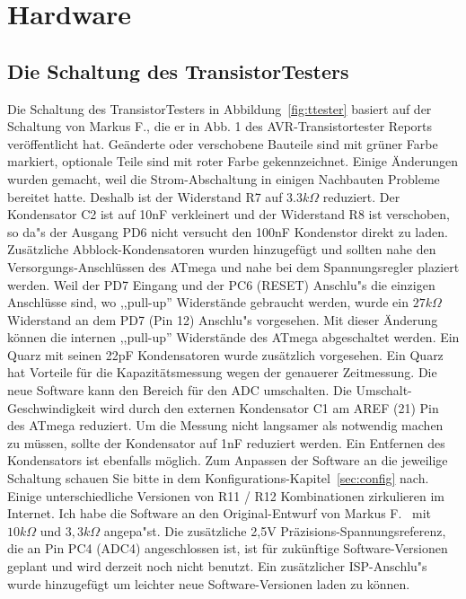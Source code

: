 \chapter{Hardware}

\section{Die Schaltung des TransistorTesters}
Die Schaltung des TransistorTesters in Abbildung~\ref{fig:ttester} basiert auf der Schaltung von
Markus F., die er in Abb. 1 des AVR-Transistortester Reports \cite{Frejek} ver\"offentlicht hat.
Ge\"anderte oder verschobene Bauteile sind mit gr\"uner Farbe markiert, optionale Teile sind
mit roter Farbe gekennzeichnet.
Einige \"Anderungen wurden gemacht, weil die Strom-Abschaltung in einigen Nachbauten Probleme
bereitet hatte.
Deshalb ist der Widerstand R7 auf \(3.3k\Omega\) reduziert. 
Der Kondensator C2 ist auf 10nF verkleinert und der Widerstand R8 ist verschoben, so da"s der
Ausgang PD6 nicht versucht den 100nF Kondenstor direkt zu laden.
Zus\"atzliche Abblock-Kondensatoren wurden hinzugef\"ugt und sollten nahe den Versorgungs-Anschl\"ussen
des ATmega und nahe bei dem Spannungsregler plaziert werden.
Weil der PD7 Eingang und der PC6 (RESET) Anschlu"s die einzigen Anschl\"usse sind, wo
,,pull-up'' Widerst\"ande gebraucht werden, wurde ein \(27k\Omega\) Widerstand an dem PD7 (Pin 12) Anschlu"s vorgesehen.
Mit dieser \"Anderung k\"onnen die internen ,,pull-up'' Widerst\"ande des ATmega abgeschaltet werden.
Ein Quarz mit seinen 22pF Kondensatoren wurde zus\"atzlich vorgesehen.
Ein Quarz hat Vorteile f\"ur die Kapazit\"atsmessung wegen der genauerer Zeitmessung.
Die neue Software kann den Bereich f\"ur den ADC umschalten. Die Umschalt-Geschwindigkeit
wird durch den externen Kondensator C1 am AREF (21) Pin des ATmega reduziert.
Um die Messung nicht langsamer als notwendig machen zu m\"ussen, sollte der Kondensator auf
1nF reduziert werden. Ein Entfernen des Kondensators ist ebenfalls m\"oglich.
Zum Anpassen der Software an die jeweilige Schaltung schauen Sie bitte in dem
Konfigurations-Kapitel~\ref{sec:config} nach. 
Einige unterschiedliche Versionen von R11 / R12 Kombinationen zirkulieren im Internet.
Ich habe die Software an den Original-Entwurf von Markus F.~\cite{Frejek} mit \(10k\Omega\) und \(3,3k\Omega\) angepa"st.
Die zus\"atzliche 2,5V Pr\"azisions-Spannungsreferenz, die an Pin PC4 (ADC4) angeschlossen ist,
ist f\"ur zuk\"unftige Software-Versionen geplant und wird derzeit noch nicht benutzt.
Ein zus\"atzlicher ISP-Anschlu"s wurde hinzugef\"ugt um leichter neue Software-Versionen
laden zu k\"onnen.

